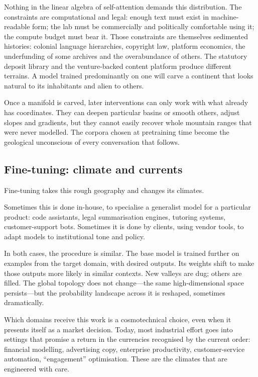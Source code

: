 \documentclass[12pt,a4paper]{article}
\begin{document}
Nothing in the linear algebra of self-attention demands this distribution. The constraints are computational and legal: enough text must exist in machine-readable form; the lab must be commercially and politically comfortable using it; the compute budget must bear it. Those constraints are themselves sedimented histories: colonial language hierarchies, copyright law, platform economics, the underfunding of some archives and the overabundance of others. The statutory deposit library and the venture-backed content platform produce different terrains. A model trained predominantly on one will carve a continent that looks natural to its inhabitants and alien to others.

Once a manifold is carved, later interventions can only work with what already has coordinates. They can deepen particular basins or smooth others, adjust slopes and gradients, but they cannot easily recover whole mountain ranges that were never modelled. The corpora chosen at pretraining time become the geological unconscious of every conversation that follows.

\subsection{Fine-tuning: climate and currents}

Fine-tuning takes this rough geography and changes its climates.

Sometimes this is done in-house, to specialise a generalist model for a particular product: code assistants, legal summarisation engines, tutoring systems, customer-support bots. Sometimes it is done by clients, using vendor tools, to adapt models to institutional tone and policy.

In both cases, the procedure is similar. The base model is trained further on examples from the target domain, with desired outputs. Its weights shift to make those outputs more likely in similar contexts. New valleys are dug; others are filled. The global topology does not change---the same high-dimensional space persists---but the probability landscape across it is reshaped, sometimes dramatically.

Which domains receive this work is a cosmotechnical choice, even when it presents itself as a market decision. Today, most industrial effort goes into settings that promise a return in the currencies recognised by the current order: financial modelling, advertising copy, enterprise productivity, customer-service automation, ``engagement'' optimisation. These are the climates that are engineered with care.
\end{document}

